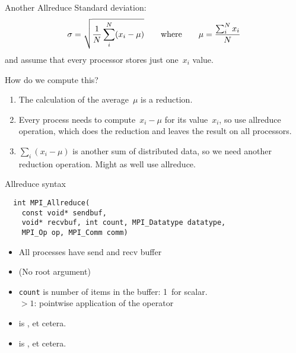 \begin{numberedframe}{Another Allreduce}
Standard deviation:
\[ \sigma = \sqrt{\frac1N \sum_i^N (x_i-\mu) }
\qquad\hbox{where}\qquad \mu = \frac{\sum_i^Nx_i}N
\]
and assume that every processor stores just one~$x_i$ value.

How do we compute this?
\begin{enumerate}
\item The calculation of the average~$\mu$ is a reduction.
\item Every
  process needs to compute~$x_i-\mu$ for its value~$x_i$, so use
  allreduce operation, which does the reduction and leaves
  the result on all processors.
\item $\sum_i(x_i-\mu)$ is another sum of
  distributed data, so we need another reduction operation. Might as
  well use allreduce.
\end{enumerate}
\end{numberedframe}

\begin{numberedframe}{Allreduce syntax}
\begin{lstlisting}
  int MPI_Allreduce(
    const void* sendbuf,
    void* recvbuf, int count, MPI_Datatype datatype,
    MPI_Op op, MPI_Comm comm)  
\end{lstlisting}
\begin{itemize}
\item All processes have send and recv buffer
\item (No root argument)
\item \lstinline{count} is number of items in the buffer: 1~for scalar.\\
  $>1$: pointwise application of the operator
\item {} is ,  et cetera.
\item {} is ,  et cetera.
\end{itemize}
\end{numberedframe}

